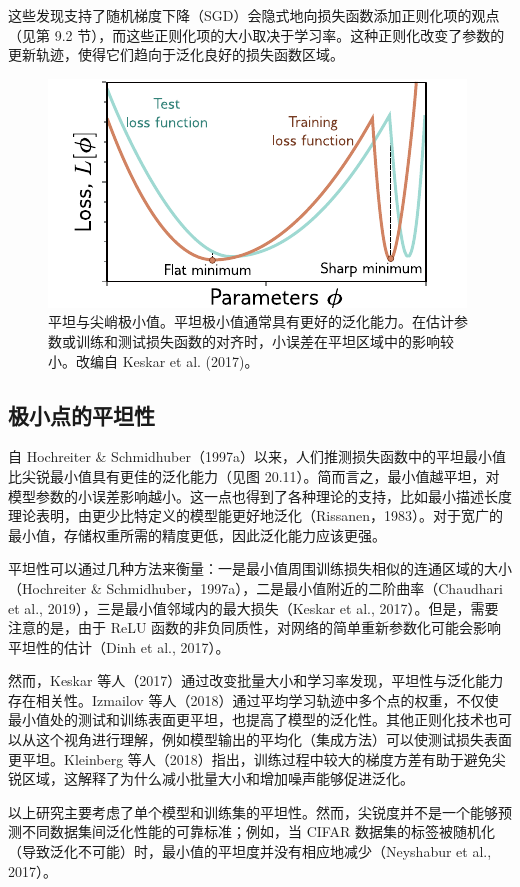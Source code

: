 \documentclass[lang=cn,newtx,10pt,scheme=chinese]{elegantbook}
\begin{document}
这些发现支持了随机梯度下降（SGD）会隐式地向损失函数添加正则化项的观点（见第 9.2 节），而这些正则化项的大小取决于学习率。这种正则化改变了参数的更新轨迹，使得它们趋向于泛化良好的损失函数区域。

\begin{figure}[ht!]
\centering
\includegraphics[width=0.7\linewidth]{PDFFigures/UDLChap21PDF/WhyFlatness.pdf}
\caption{平坦与尖峭极小值。平坦极小值通常具有更好的泛化能力。在估计参数或训练和测试损失函数的对齐时，小误差在平坦区域中的影响较小。改编自 Keskar et al. (2017)。}
\end{figure}

\subsection{极小点的平坦性}
自 Hochreiter \& Schmidhuber（1997a）以来，人们推测损失函数中的平坦最小值比尖锐最小值具有更佳的泛化能力（见图 20.11）。简而言之，最小值越平坦，对模型参数的小误差影响越小。这一点也得到了各种理论的支持，比如最小描述长度理论表明，由更少比特定义的模型能更好地泛化（Rissanen，1983）。对于宽广的最小值，存储权重所需的精度更低，因此泛化能力应该更强。

平坦性可以通过几种方法来衡量：一是最小值周围训练损失相似的连通区域的大小（Hochreiter \& Schmidhuber，1997a），二是最小值附近的二阶曲率（Chaudhari et al., 2019），三是最小值邻域内的最大损失（Keskar et al., 2017）。但是，需要注意的是，由于 ReLU 函数的非负同质性，对网络的简单重新参数化可能会影响平坦性的估计（Dinh et al., 2017）。

然而，Keskar 等人（2017）通过改变批量大小和学习率发现，平坦性与泛化能力存在相关性。Izmailov 等人（2018）通过平均学习轨迹中多个点的权重，不仅使最小值处的测试和训练表面更平坦，也提高了模型的泛化性。其他正则化技术也可以从这个视角进行理解，例如模型输出的平均化（集成方法）可以使测试损失表面更平坦。Kleinberg 等人（2018）指出，训练过程中较大的梯度方差有助于避免尖锐区域，这解释了为什么减小批量大小和增加噪声能够促进泛化。

以上研究主要考虑了单个模型和训练集的平坦性。然而，尖锐度并不是一个能够预测不同数据集间泛化性能的可靠标准；例如，当 CIFAR 数据集的标签被随机化（导致泛化不可能）时，最小值的平坦度并没有相应地减少（Neyshabur et al., 2017）。
\end{document}
